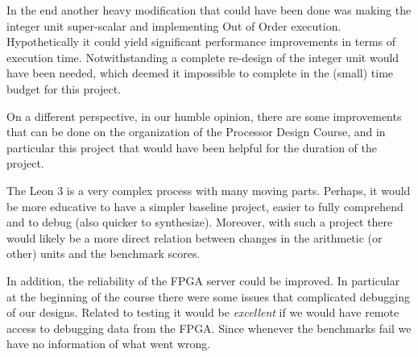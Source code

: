 In the end another heavy modification that could have been done was making the
integer unit super-scalar and implementing Out of Order execution. Hypothetically it could yield 
significant performance improvements in terms of execution time. Notwithstanding a complete re-design of the integer unit
would have been needed, which deemed it impossible to complete in the (small) time budget for this project.


On a different perspective, in our humble opinion, there are some improvements that can be done on the organization of the Processor Design Course, and in particular this project that would have been helpful for the duration of the project.

The Leon 3 is a very complex process with many moving parts. Perhaps, it would be more educative to have a simpler baseline project, easier to fully comprehend and to debug (also quicker to synthesize). Moreover, with such a project there would likely be a more direct relation between changes in the arithmetic (or other) units and the benchmark scores.

In addition, the reliability of the FPGA server could be improved. In particular at the beginning of the course there were some issues that complicated debugging of our designs. Related to testing it would be \emph{excellent} if we would have remote access to debugging data from the FPGA. Since whenever the benchmarks fail we have no information of what went wrong.

